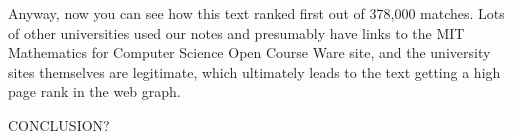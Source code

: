 Anyway, now you can see how this text ranked first out of 378,000
matches.  Lots of other universities used our notes and presumably
have links to the MIT Mathematics for Computer Science Open Course
Ware site, and the university sites themselves are legitimate, which
ultimately leads to the text getting a high page rank in the web
graph.

\begin{problems}
\practiceproblems
{}

\classproblems
{}

\homeworkproblems
{}

\examproblems
{}

\end{problems}
\begin{editingnotes}
CONCLUSION?
\end{editingnotes}
\endinput
